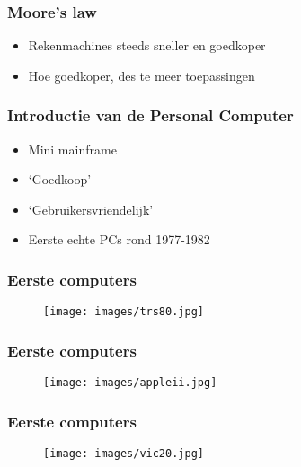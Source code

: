 \documentclass[aspectratio=43]{uva-inf-presentation}
\begin{document}

\begin{frame}
\frametitle{Moore's law}

\begin{itemize}
\item Rekenmachines steeds sneller en goedkoper
\item Hoe goedkoper, des te meer toepassingen
\end{itemize}

\end{frame}


\begin{frame}
\frametitle{Introductie van de Personal Computer}

\begin{itemize}
\item Mini mainframe
\item `Goedkoop'
\item `Gebruikersvriendelijk'
\item Eerste echte PCs rond 1977-1982
\end{itemize}

\end{frame}


\begin{frame}
\frametitle{Eerste computers}

\begin{figure}
\texttt{[image: images/trs80.jpg]}
\end{figure}

\end{frame}


\begin{frame}
\frametitle{Eerste computers}

\begin{figure}
\texttt{[image: images/appleii.jpg]}
\end{figure}

\end{frame}


\begin{frame}
\frametitle{Eerste computers}

\begin{figure}
\texttt{[image: images/vic20.jpg]}
\end{figure}

\end{frame}
\end{document}
